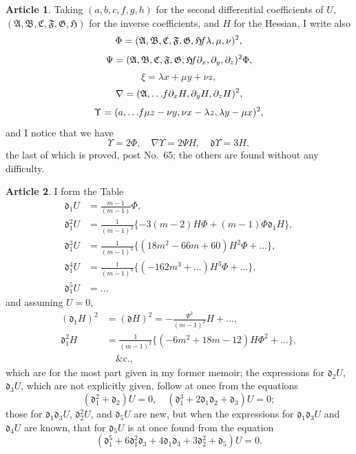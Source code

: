 \documentclass[12pt,a4paper]{article}
\theoremstyle{definition}
\newtheorem{art}{Article}[section]
\begin{document}
\begin{art}
Taking $(a, b, c, f, g, h)$ for the second differential coefficients of $U$, $(\mathfrak{A}, \mathfrak{B}, \mathfrak{C}, \mathfrak{F}, \mathfrak{G}, \mathfrak{H})$ for the inverse coefficients, and $H$ for the Hessian, I write also
\[
\Phi = (\mathfrak{A}, \mathfrak{B}, \mathfrak{C}, \mathfrak{F}, \mathfrak{G}, \mathfrak{H} \hspace{-2pt} f\lambda, \mu, \nu)^2,
\]
\[
\Psi = (\mathfrak{A}, \mathfrak{B}, \mathfrak{C}, \mathfrak{F}, \mathfrak{G}, \mathfrak{H} \hspace{-2pt} f\partial_x, \partial_y, \partial_z)^2 \Phi,
\]
\[
\xi = \lambda x + \mu y + \nu z,
\]
\[
\nabla = (\mathfrak{A}, \ldots \hspace{-2pt} f\partial_x H, \partial_y H, \partial_z H)^2,
\]
\[
\Upsilon = (a, \ldots \hspace{-2pt} f\mu z - \nu y, \nu x - \lambda z, \lambda y - \mu x)^2,
\]
and I notice that we have
\[
\Upsilon = 2\Phi, \quad \nabla\Upsilon = 2\Psi H, \quad \mathfrak{d}\Upsilon = 3H,
\]
the last of which is proved, post No.~65; the others are found without any difficulty.
\end{art}

\begin{art}
I form the Table
\begin{align*}
\mathfrak{d}_1 U &= \frac{m - 1}{(m - 1)}\Phi, \\
\mathfrak{d}_1^2 U &= \frac{1}{(m - 1)^2}\{-3(m - 2)H\Phi + (m - 1)\Phi\mathfrak{d}_1 H\}, \\
\mathfrak{d}_1^3 U &= \frac{1}{(m - 1)^3}\{(18m^2 - 66m + 60)H^2\Phi + \ldots\}, \\
\mathfrak{d}_1^4 U &= \frac{1}{(m - 1)^4}\{(-162m^3 + \ldots)H^3\Phi + \ldots\}, \\
\mathfrak{d}_1^5 U &= \ldots
\end{align*}
and assuming $U = 0$,
\begin{align*}
(\mathfrak{d}_1 H)^2 &= (\mathfrak{d}H)^2 = -\frac{\Psi^2}{(m - 1)^2}H + \ldots, \\
\mathfrak{d}_1^2 H &= \frac{1}{(m - 1)^2}\{(-6m^2 + 18m - 12)H\Phi^2 + \ldots\}, \\
&\quad \&\text{c.},
\end{align*}
which are for the most part given in my former memoir; the expressions for $\mathfrak{d}_2 U$, $\mathfrak{d}_3 U$, which are not explicitly given, follow at once from the equations
\[
(\mathfrak{d}_1^2 + \mathfrak{d}_2)U = 0, \quad (\mathfrak{d}_1^3 + 2\mathfrak{d}_1\mathfrak{d}_2 + \mathfrak{d}_3)U = 0;
\]
those for $\mathfrak{d}_1\mathfrak{d}_3 U$, $\mathfrak{d}_2^2 U$, and $\mathfrak{d}_5 U$ are new, but when the expressions for $\mathfrak{d}_1\mathfrak{d}_3 U$ and $\mathfrak{d}_4 U$ are known, that for $\mathfrak{d}_5 U$ is at once found from the equation
\[
(\mathfrak{d}_1^5 + 6\mathfrak{d}_1^2\mathfrak{d}_3 + 4\mathfrak{d}_1\mathfrak{d}_3 + 3\mathfrak{d}_2^2 + \mathfrak{d}_5)U = 0.
\]
\end{art}
\end{document}
